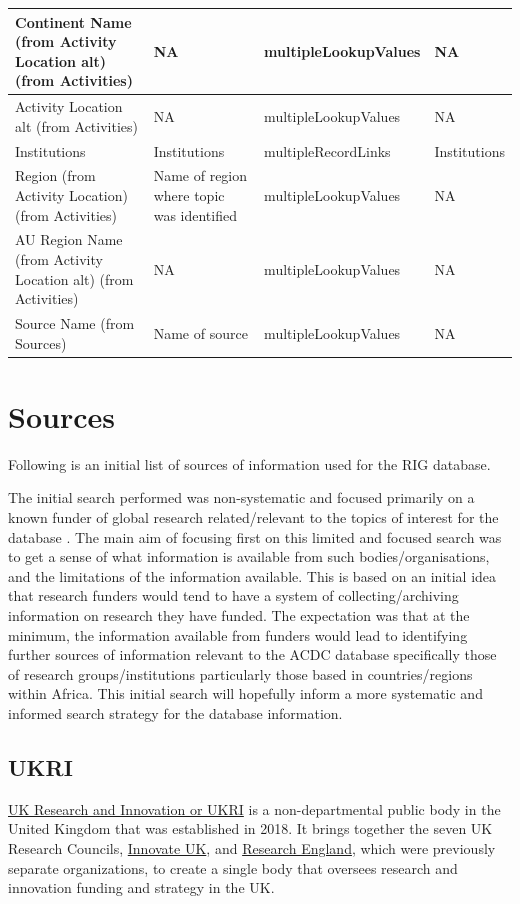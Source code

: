 \documentclass[
]{book}
\begin{document}
\begin{table}
\begin{tabular}{l|l|l|l}
\hline
Continent Name (from Activity Location alt) (from Activities) & NA & multipleLookupValues & NA\\
\hline
Activity Location alt (from Activities) & NA & multipleLookupValues & NA\\
\hline
Institutions & Institutions & multipleRecordLinks & Institutions\\
\hline
Region (from Activity Location) (from Activities) & Name of region where topic was identified & multipleLookupValues & NA\\
\hline
AU Region Name (from Activity Location alt) (from Activities) & NA & multipleLookupValues & NA\\
\hline
Source Name (from Sources) & Name of source & multipleLookupValues & NA\\
\hline
\end{tabular}
\end{table}

\hypertarget{sources}{%
\chapter{Sources}\label{sources}}

Following is an initial list of sources of information used for the RIG database.

The initial search performed was non-systematic and focused primarily on a known funder of global research related/relevant to the topics of interest for the database . The main aim of focusing first on this limited and focused search was to get a sense of what information is available from such bodies/organisations, and the limitations of the information available. This is based on an initial idea that research funders would tend to have a system of collecting/archiving information on research they have funded. The expectation was that at the minimum, the information available from funders would lead to identifying further sources of information relevant to the ACDC database specifically those of research groups/institutions particularly those based in countries/regions within Africa. This initial search will hopefully inform a more systematic and informed search strategy for the database information.

\hypertarget{ukri}{%
\section{UKRI}\label{ukri}}

\href{https://www.ukri.org/}{UK Research and Innovation or UKRI} is a non-departmental public body in the United Kingdom that was established in 2018. It brings together the seven UK Research Councils, \href{https://www.ukri.org/councils/innovate-uk/}{Innovate UK}, and \href{https://www.ukri.org/councils/research-england/}{Research England}, which were previously separate organizations, to create a single body that oversees research and innovation funding and strategy in the UK.
\end{document}
